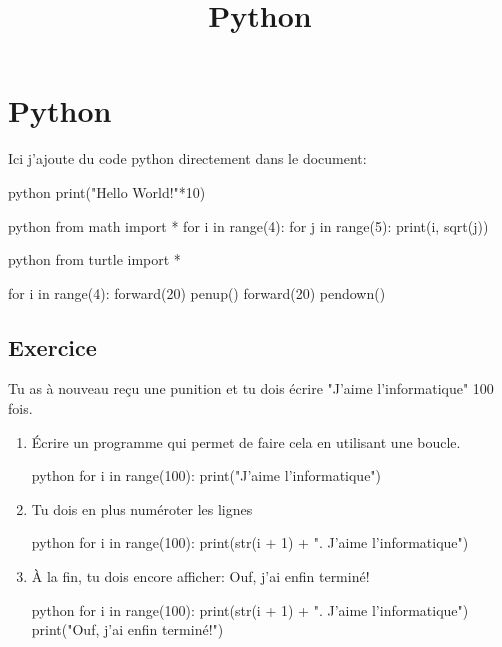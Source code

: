 \documentclass[a4paper,11pt]{article}
\begin{document}
\title{Python}
\date{}
\maketitle


\section{Python}
Ici j'ajoute du code python directement dans le document:\par

\begin{code}{python}
print("Hello World!"*10)
\end{code}

\begin{code}[interactive]{python}
from math import *
for i in range(4):
    for j in range(5):
        print(i, sqrt(j))
\end{code}

\begin{code}{python}
from turtle import *

for i in range(4):
    forward(20)
    penup()
    forward(20)
    pendown()
\end{code}


\subsection{Exercice}
Tu as à nouveau reçu une punition et tu dois écrire "J'aime l'informatique" 100 fois.
\begin{enumerate}
\item Écrire un programme qui permet de faire cela en utilisant une boucle.
\begin{solution}
\begin{code}[interactive]{python}
for i in range(100):
    print("J'aime l'informatique")
\end{code}
\end{solution}
\item Tu dois en plus numéroter les lignes
\begin{solution}
\begin{code}[interactive]{python}
for i in range(100):
    print(str(i + 1) + ". J'aime l'informatique")
\end{code}
\end{solution}
\item À la fin, tu dois encore afficher: Ouf, j'ai enfin terminé!
\begin{solution}
\begin{code}[interactive]{python}
for i in range(100):
    print(str(i + 1) + ". J'aime l'informatique")
print("Ouf, j'ai enfin terminé!")
\end{code}
\end{solution}
\end{enumerate}
\end{document}
